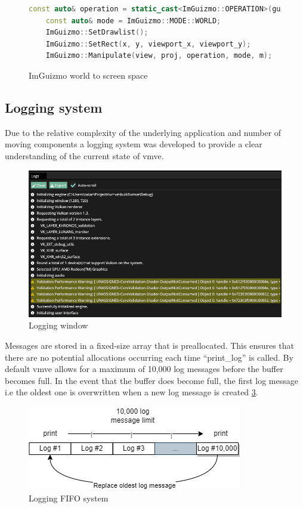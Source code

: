 \documentclass[11pt]{article}
\begin{document}
\begin{figure}[ht]
  \centering
  \begin{lstlisting}[language=C++]
    const auto& operation = static_cast<ImGuizmo::OPERATION>(guizmo_operation);
    const auto& mode = ImGuizmo::MODE::WORLD;
    ImGuizmo::SetDrawlist();
    ImGuizmo::SetRect(x, y, viewport_x, viewport_y);
    ImGuizmo::Manipulate(view, proj, operation, mode, m);
  \end{lstlisting}
  \caption{ImGuizmo world to screen space}
  \label{fig:imguizmo_code}
\end{figure}

\subsection{Logging system}
Due to the relative complexity of the underlying application and number of
moving components a logging system was developed to provide a clear
understanding of the current state of \gls{vmve}. 

\begin{figure}[h!]
  \centering
  \includegraphics[width=\textwidth]{images/logging_window.png}
  \caption{Logging window}
  \label{fig:logging_window}
\end{figure}

Messages are stored in a fixed-size array that is preallocated. This ensures
that there are no potential allocations occurring each time ``print\_log''  is
called. By default \gls{vmve} allows for a maximum of 10,000 log messages before
the buffer becomes full. In the event that the buffer does become full, the
first log message i.e the oldest one is overwritten when a new log message is
created \ref{fig:logging_system}. 

\begin{figure}[h!]
  \centering
  \includegraphics[width=\textwidth]{images/logging.png}
  \caption{Logging FIFO system}
  \label{fig:logging_system}
\end{figure}
\end{document}
